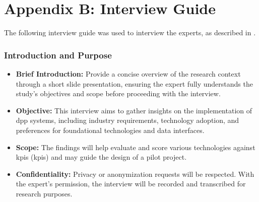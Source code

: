 \chapter{Appendix B: Interview Guide}
\label{cha:anhang_B}

\renewcommand*{\thepage}{B-\arabic{page}} %

The following interview guide was used to interview the experts, as described in .

\subsection*{Introduction and Purpose}
\begin{itemize}
    \item \textbf{Brief Introduction:} Provide a concise overview of the research context through a short slide presentation, ensuring the expert fully understands the study’s objectives and scope before proceeding with the interview.
    \item \textbf{Objective:} This interview aims to gather insights on the implementation of \acrlong{dpp} systems, including industry requirements, technology adoption, and preferences for foundational technologies and data interfaces.
    \item \textbf{Scope:} The findings will help evaluate and score various technologies against \acrlong{kpi}s (\ac{kpi}s) and may guide the design of a pilot project.
    \item \textbf{Confidentiality:} Privacy or anonymization requests will be respected. With the expert's permission, the interview will be recorded and transcribed for research purposes.
\end{itemize}

